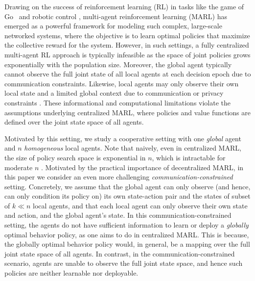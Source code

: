 Drawing on the success of reinforcement learning (RL) in tasks like the game of Go~\citep{Silver_Huang_Maddison_Guez_Sifre_van_den_Driessche_Schrittwieser_Antonoglou_Panneershelvam_Lanctot_et_al._2016} and robotic control \citep{doi:10.1177/0278364913495721}, multi-agent reinforcement learning (MARL) has emerged as a powerful framework for modeling such complex, large-scale networked systems, where the objective is to learn optimal policies that maximize the collective reward for the system. However, in such settings, a fully centralized multi-agent RL approach is typically infeasible as the space of joint policies grows exponentially with the population size. Moreover, the global agent typically cannot observe the full joint state of all local agents at each decision epoch due to communication constraints. Likewise, local agents may only observe their own local state and a limited global context due to communication or privacy constraints \cite{Yang_2023}. These informational and computational limitations violate the assumptions underlying  centralized MARL, where policies and value functions are defined over the joint state space of all agents.

Motivated by this setting, we study a cooperative setting with one \emph{global} agent and $n$ \emph{homogeneous}
local agents.  
Note that naively, even in centralized MARL, the size of policy search space is exponential in $n$, which is intractable for moderate $n$ \citep{daskalakis2007computing,Blondel_Tsitsiklis_2000, anand2024efficientreinforcementlearningglobal}. Motivated by the practical importance of decentralized MARL, in this paper we consider an even more challenging \emph{communication-constrained} setting. Concretely, we assume that the global agent can only observe (and hence, can only condition its policy on) its own state-action pair and the states of subset of $k \ll n$ local agents, and that each local agent can only observe their own state and action, and the global agent's state. In this communication-constrained setting, the agents  do not have sufficient information to learn or deploy a \emph{globally} optimal behavior policy, as one aims to do in centralized MARL. This is because, the globally optimal behavior policy would, in general, be a mapping over the full joint state space of all agents. In contrast, in the communication-constrained scenario, agents are unable to observe the full joint state space, and hence such policies are neither learnable nor deployable. 

